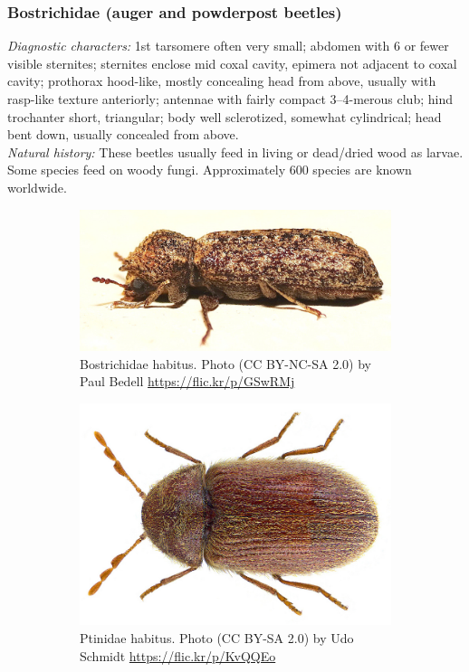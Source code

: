\documentclass[letterpaper, 11pt]{article}
\begin{document}
\subsubsection{Bostrichidae (auger and powderpost beetles)}
\noindent{}\textit{Diagnostic characters:} 1st tarsomere often very small; abdomen with 6 or fewer visible sternites; sternites enclose mid coxal cavity, epimera not adjacent to coxal cavity; prothorax hood-like, mostly concealing head from above, usually with rasp-like texture anteriorly; antennae with fairly compact 3--4-merous club; hind trochanter short, triangular; body well sclerotized, somewhat cylindrical; head bent down, usually concealed from above.\\

\noindent{}\textit{Natural history:} These beetles usually feed in living or dead/dried wood as larvae. Some species feed on woody fungi. Approximately 600 species are known worldwide.

\begin{figure}[ht!]
  \centering
\begin{subfigure}[ht!]{0.45\textwidth}
    \includegraphics[width=\textwidth]{BostrichidHabitus}
  \caption{Bostrichidae habitus. Photo (CC BY-NC-SA 2.0) by Paul Bedell \url{https://flic.kr/p/GSwRMj}}
  \label{fig:bostrichid}
\end{subfigure}
    \qquad 
\begin{subfigure}[ht!]{0.42\textwidth}
    \includegraphics[width=\textwidth]{AnobiidHabitus}
  \caption{Ptinidae habitus. Photo (CC BY-SA 2.0) by Udo Schmidt \url{https://flic.kr/p/KvQQEo}}
  \label{fig:anobiid}\end{subfigure}
    \caption{}\label{fig:anobiidderm}
\end{figure}
\end{document}
